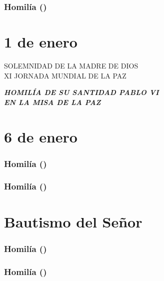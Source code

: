 \subsubsection{Homilía ()}

\section{1 de enero}  SOLEMNIDAD DE LA MADRE DE DIOS\\ XI JORNADA MUNDIAL DE LA PAZ

\emph{\textbf{HOMILÍA DE SU SANTIDAD PABLO VI\\ EN LA MISA DE LA PAZ}\\[2\baselineskip]}


\section{6 de enero} 



\subsubsection{Homilía ()}

\subsubsection{Homilía ()}

\section{Bautismo del Señor} 



\subsubsection{Homilía ()}

\subsubsection{Homilía ()}
